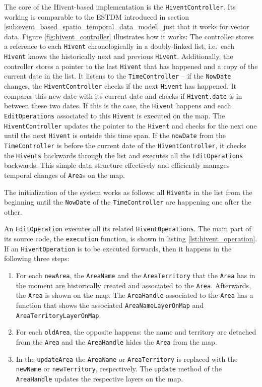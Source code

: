 The core of the Hivent-based implementation is the \texttt{HiventController}. Its working is comparable to the ESTDM introduced in section \ref{sub:event_based_spatio_temporal_data_model}, just that it works for vector data. Figure \ref{fig:hivent_controller} illustrates how it works: The controller stores a reference to each \texttt{Hivent} chronologically in a doubly-linked list, i.e.\ each \texttt{Hivent} knows the historically next and previous \texttt{Hivent}. Additionally, the controller stores a pointer to the last \texttt{Hivent} that has happened and a copy of the current date in the list. It listens to the \texttt{TimeController} -- if the \texttt{NowDate} changes, the \texttt{HiventController} checks if the next \texttt{Hivent} has happened. It compares this new date with its current date and checks if \texttt{Hivent.date} is in between these two dates. If this is the case, the \texttt{Hivent} happens and each \texttt{EditOperations} associated to this \texttt{Hivent} is executed on the map. The \texttt{HiventController} updates the pointer to the \texttt{Hivent} and checks for the next one until the next \texttt{Hivent} is outside this time span. If the \texttt{nowDate} from the \texttt{TimeController} is before the current date of the \texttt{HiventController}, it checks the \texttt{Hivents} backwards through the list and executes all the \texttt{EditOperations} backwards. This simple data structure effectively and efficiently manages temporal changes of \texttt{Area}s on the map.

The initialization of the system works as follows: all \texttt{Hivent}s in the list from the beginning until the \texttt{NowDate} of the \texttt{TimeController} are happening one after the other.

An \texttt{EditOperation} executes all its related \texttt{HiventOperations}. The main part of its source code, the \texttt{execution} function, is shown in listing \ref{lst:hivent_operation}. If an \texttt{HiventOperation} is to be executed forwards, then it happens in the following three steps:

\begin{enumerate}
  \item For each \texttt{newArea}, the \texttt{AreaName} and the \texttt{AreaTerritory} that the \texttt{Area} has in the moment are historically created and associated to the \texttt{Area}. Afterwards, the \texttt{Area} is shown on the map. The \texttt{AreaHandle} associated to the \texttt{Area} has a function that shows the associated \texttt{AreaNameLayerOnMap} and \texttt{AreaTerritoryLayerOnMap}.
  \item For each \texttt{oldArea}, the opposite happens: the name and territory are detached from the \texttt{Area} and the \texttt{AreaHandle} hides the \texttt{Area} from the map.
  \item In the \texttt{updateArea} the \texttt{AreaName} or \texttt{AreaTerritory} is replaced with the \texttt{newName} or \texttt{newTerritory}, respectively. The \texttt{update} method of the \texttt{AreaHandle} updates the respective layers on the map.
\end{enumerate}

